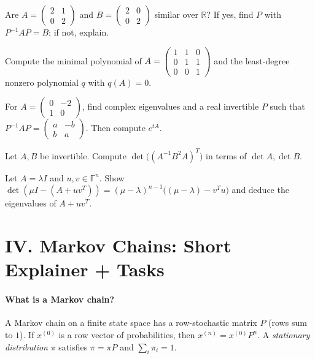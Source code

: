 \documentclass[11pt]{article}
\begin{document}
\begin{problem}
Are 
$A=\begin{pmatrix}2&1\\0&2\end{pmatrix}$ and $B=\begin{pmatrix}2&0\\0&2\end{pmatrix}$ similar over $\mathbb{R}$? If yes, find $P$ with $P^{-1}AP=B$; if not, explain.
\end{problem}

\begin{problem}
Compute the minimal polynomial of $A=\begin{pmatrix}1&1&0\\0&1&1\\0&0&1\end{pmatrix}$ and the least-degree nonzero polynomial $q$ with $q(A)=0$.
\end{problem}

\begin{problem}
For $A=\begin{pmatrix}0&-2\\1&0\end{pmatrix}$, find complex eigenvalues and a real invertible $P$ such that 
$P^{-1}AP=\begin{pmatrix}a&-b\\ b&a\end{pmatrix}$. Then compute $e^{tA}$.
\end{problem}

\begin{problem}
Let $A,B$ be invertible. Compute $\det\big((A^{-1}B^2A)^T\big)$ in terms of $\det A,\det B$.
\end{problem}

\begin{problem}
Let $A=\lambda I$ and $u,v\in\mathbb{F}^n$. Show
$\det(\mu I-(A+uv^T))=(\mu-\lambda)^{n-1}\big((\mu-\lambda)-v^Tu\big)$
and deduce the eigenvalues of $A+uv^T$.
\end{problem}

\section*{IV. Markov Chains: Short Explainer + Tasks}

\paragraph{What is a Markov chain?} 
A Markov chain on a finite state space has a row-stochastic matrix $P$ (rows sum to $1$). 
If $x^{(0)}$ is a row vector of probabilities, then $x^{(n)}=x^{(0)}P^n$. 
A \emph{stationary distribution} $\pi$ satisfies $\pi=\pi P$ and $\sum_i \pi_i=1$.
\end{document}

